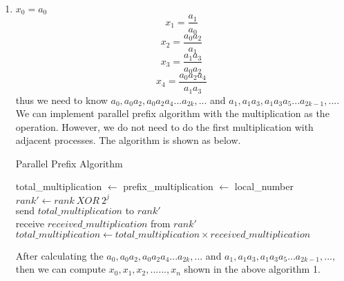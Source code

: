 \documentclass[twoside,12pt]{article}
\begin{document}
\begin{enumerate}
\vspace{3mm}

\item $ x_0=a_0 $
\[ x_1=\frac{a_1}{a_0} \]
\[ x_2=\frac{a_0a_2}{a_1} \]
\[ x_3=\frac{a_1a_3}{a_0a_2} \]
\[ x_4=\frac{a_0a_2a_4}{a_1a_3} \]
thus we need to know $ a_0, a_0a_2, a_0a_2a_4...a_{2k},... $ and $ a_1, a_1a_3, a_1a_3a_5...a_{2k-1},... $. \\
We can implement parallel prefix algorithm with the multiplication as the operation. However, we do not need to do the first multiplication with adjacent processes. The algorithm is shown as below.

\begin{algorithm}[H]
	\caption{Parallel Prefix Algorithm}
	total\_multiplication $ \gets $ prefix\_multiplication $ \gets $ local\_number\\
	{
		$ rank' \gets rank\ XOR\ 2^{j} $\\
		send $ total\_multiplication $ to $ rank' $\\
		receive $ received\_multiplication $ from $ rank' $\\
		$ total\_multiplication \gets total\_multiplication \times received\_multiplication $\\
	}
\end{algorithm}
After calculating the $ a_0, a_0a_2, a_0a_2a_4...a_{2k},... $ and $ a_1, a_1a_3, a_1a_3a_5...a_{2k-1},... $, then we can compute $ x_0, x_1, x_2,......,x_n $ shown in the above algorithm 1.


\end{enumerate}
\end{document}
